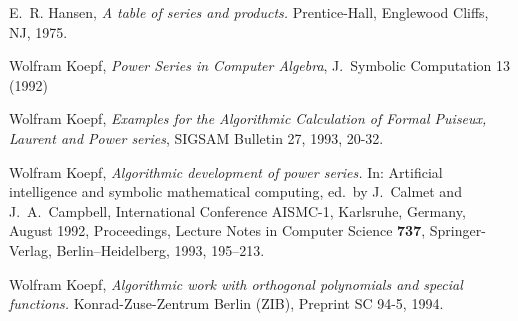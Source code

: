 \begin{thebibliography}{9}

E.\ R. Hansen, {\em A table of series and products.}
Prentice-Hall, Englewood Cliffs, NJ, 1975.

 Wolfram Koepf,
{\em Power Series in Computer Algebra},
J.\ Symbolic Computation 13 (1992)

 Wolfram Koepf,
{\em Examples for the Algorithmic Calculation of Formal
Puiseux, Laurent and Power series},
SIGSAM Bulletin 27, 1993, 20-32.

 Wolfram Koepf,
{\em Algorithmic development of power series.} In:
Artificial intelligence and symbolic mathematical computing,
ed.\ by J.\ Calmet and J.\ A.\ Campbell,
International Conference AISMC-1, Karlsruhe, Germany, August 1992, Proceedings,
Lecture Notes in Computer Science {\bf 737}, Springer-Verlag,
Berlin--Heidelberg, 1993, 195--213.

 Wolfram Koepf,
{\em Algorithmic work with orthogonal polynomials and special functions.}
Konrad-Zuse-Zentrum Berlin (ZIB), Preprint SC 94-5, 1994.

\end{thebibliography}



